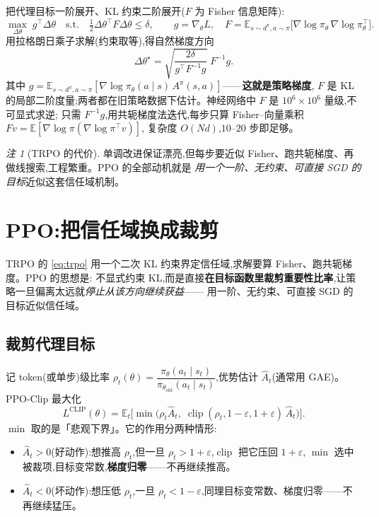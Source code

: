 \documentclass[11pt]{article}
\newcommand{\E}{\mathbb{E}}
\newcommand{\Ap}{A^{\pi}}
\newcommand{\dpi}{d^{\pi}}
\newcommand{\piold}{\pi_{\theta_{\mathrm{old}}}}
\newcommand{\pith}{\pi_\theta}
\DeclareMathOperator{\clip}{clip}
\theoremstyle{plain}
\theoremstyle{definition}
\theoremstyle{remark}
\newtheorem{remark}[theorem]{注}
\begin{document}
把代理目标一阶展开、KL 约束二阶展开($F$ 为 Fisher 信息矩阵):
\[
\max_{\Delta\theta}\;g^\top\Delta\theta\quad\text{s.t.}\quad \tfrac12\Delta\theta^\top F\Delta\theta\le\delta,
\qquad g=\nabla_\theta L,\quad F=\E_{s\sim\dpi,a\sim\pi}\big[\nabla\log\pith\,\nabla\log\pith^\top\big].
\]
用拉格朗日乘子求解(约束取等),得自然梯度方向
\begin{equation}\label{eq:nat-grad}
\Delta\theta^\star=\sqrt{\frac{2\delta}{g^\top F^{-1}g}}\;F^{-1}g.
\end{equation}
其中 $g=\E_{s\sim\dpi,a\sim\pi}[\nabla\log\pith(a\mid s)\,\Ap(s,a)]$——\textbf{这就是策略梯度},
$F$ 是 KL 的局部二阶度量;两者都在旧策略数据下估计。神经网络中 $F$ 是 $10^6\times10^6$ 量级,不可显式求逆;
只需 $F^{-1}g$,用共轭梯度法迭代,每步只算 Fisher--向量乘积 $Fv=\E[\nabla\log\pi(\nabla\log\pi^\top v)]$,
复杂度 $O(Nd)$,$10$--$20$ 步即足够。

\begin{remark}[TRPO 的代价]
单调改进保证漂亮,但每步要近似 Fisher、跑共轭梯度、再做线搜索,工程繁重。PPO 的全部动机就是
\emph{用一个一阶、无约束、可直接 SGD 的目标}近似这套信任域机制。
\end{remark}

\section{PPO:把信任域换成裁剪}

TRPO 的 \eqref{eq:trpo} 用一个二次 KL 约束界定信任域,求解要算 Fisher、跑共轭梯度。PPO 的思想是:
不显式约束 KL,而是直接\textbf{在目标函数里裁剪重要性比率},让策略一旦偏离太远就\emph{停止从该方向继续获益}——
用一阶、无约束、可直接 SGD 的目标近似信任域。

\subsection{裁剪代理目标}

记 token(或单步)级比率 $\rho_t(\theta)=\dfrac{\pith(a_t\mid s_t)}{\piold(a_t\mid s_t)}$,优势估计 $\hat A_t$(通常用 GAE)。PPO-Clip 最大化
\begin{equation}\label{eq:ppo-clip}
L^{\mathrm{CLIP}}(\theta)=\E_t\Big[\min\big(\rho_t\hat A_t,\;\clip(\rho_t,1-\varepsilon,1+\varepsilon)\,\hat A_t\big)\Big].
\end{equation}
$\min$ 取的是「悲观下界」。它的作用分两种情形:

\begin{itemize}[topsep=2pt,itemsep=1pt]
\item $\hat A_t>0$(好动作):想推高 $\rho_t$,但一旦 $\rho_t>1+\varepsilon$,$\clip$ 把它压回 $1+\varepsilon$,
$\min$ 选中被裁项,目标变常数,\textbf{梯度归零}——不再继续推高。
\item $\hat A_t<0$(坏动作):想压低 $\rho_t$,一旦 $\rho_t<1-\varepsilon$,同理目标变常数、梯度归零——不再继续猛压。
\end{itemize}
\end{document}
